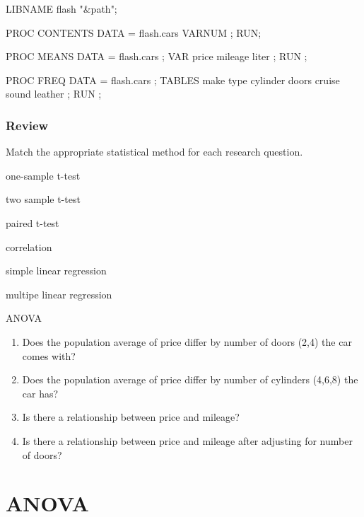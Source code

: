 \begin{frame}[fragile]
\footnotesize
\begin{code}{.0}
LIBNAME flash "&path";

PROC CONTENTS DATA = flash.cars VARNUM ;
RUN;

PROC MEANS DATA = flash.cars ;
   VAR price mileage liter ;
RUN ;

PROC FREQ DATA = flash.cars ;
   TABLES make type cylinder doors cruise sound leather ;
RUN ;
\end{code}
\emp
\end{frame}

\begin{frame}
\frametitle{Review}
\oyo Match the appropriate statistical method for each research question.
\vskip10pt
\be
\item one-sample t-test
\item two sample t-test
\item paired t-test
\item correlation
\item simple linear regression
\item multipe linear regression
\item ANOVA
\ee
\emp
{} \hspace{0.05in} \emp
{}
\begin{enumerate}[]
\item[\underline{\hspace{0.25in}}] Does the population average of price differ by number of doors (2,4) the car comes with?
\item[\underline{\hspace{0.25in}}] Does the population average of price differ by number of cylinders (4,6,8) the car has?
\item[\underline{\hspace{0.25in}}] Is there a relationship between price and mileage?
\item[\underline{\hspace{0.25in}}] Is there a relationship between price and mileage after adjusting for number of doors?
\end{enumerate}
\emp
\end{frame}
\section[ANOVA]{ANOVA}
